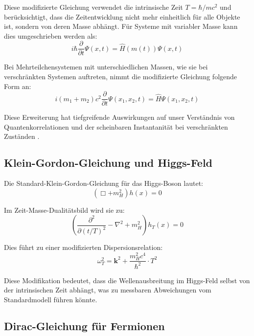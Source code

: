 \documentclass[a4paper,12pt]{article}
\begin{document}
	Diese modifizierte Gleichung verwendet die intrinsische Zeit $T = \hbar/mc^2$ und berücksichtigt, dass die Zeitentwicklung nicht mehr einheitlich für alle Objekte ist, sondern von deren Masse abhängt. Für Systeme mit variabler Masse kann dies umgeschrieben werden als:
	\begin{equation}
		i\hbar \frac{\partial}{\partial t}\Psi(x,t) = \hat{H}(m(t))\Psi(x,t)
	\end{equation}
	
	Bei Mehrteilchensystemen mit unterschiedlichen Massen, wie sie bei verschränkten Systemen auftreten, nimmt die modifizierte Gleichung folgende Form an:
	\begin{equation}
		i (m_1 + m_2) c^2 \frac{\partial}{\partial t} \Psi(x_1, x_2, t) = \hat{H} \Psi(x_1, x_2, t)
	\end{equation}
	
	Diese Erweiterung hat tiefgreifende Auswirkungen auf unser Verständnis von Quantenkorrelationen und der scheinbaren Instantanität bei verschränkten Zuständen \cite{Pascher2024}.
	
	\subsection{Klein-Gordon-Gleichung und Higgs-Feld}
	
	Die Standard-Klein-Gordon-Gleichung für das Higgs-Boson lautet:
	\begin{equation}
		(\Box + m_H^2) h(x) = 0
	\end{equation}
	
	Im Zeit-Masse-Dualitätsbild wird sie zu:
	\begin{equation}
		\left(\frac{\partial^2}{\partial(t/T)^2} - \nabla^2 + m_H^2\right) h_T(x) = 0
	\end{equation}
	
	Dies führt zu einer modifizierten Dispersionsrelation:
	\begin{equation}
		\omega_T^2 = \mathbf{k}^2 + \frac{m_H^2 c^4}{\hbar^2} \cdot T^2
	\end{equation}
	
	Diese Modifikation bedeutet, dass die Wellenausbreitung im Higgs-Feld selbst von der intrinsischen Zeit abhängt, was zu messbaren Abweichungen vom Standardmodell führen könnte.
	
	\subsection{Dirac-Gleichung für Fermionen}
	
\end{document}
